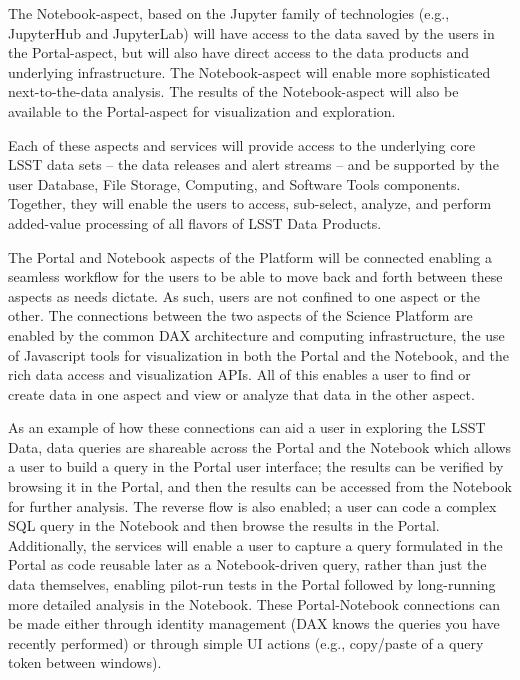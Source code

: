 \documentclass[DM,lsstdraft,toc]{lsstdoc}
\begin{document}
The Notebook-aspect, based on the Jupyter family of technologies (e.g., 
JupyterHub and JupyterLab) will have access to the data saved by the users in 
the Portal-aspect, but will also have direct access to the data products and 
underlying infrastructure.  The Notebook-aspect will enable more sophisticated 
next-to-the-data analysis.  The results of the Notebook-aspect will also be 
available to the Portal-aspect for visualization and exploration.  

Each of these aspects and services will provide access to the underlying core 
LSST data sets -- the data releases and alert streams -- and be supported by 
the user Database, File Storage, Computing, and Software Tools components.  
Together, they will enable the users to access, sub-select, analyze, and perform 
added-value processing of all flavors of LSST Data Products.

The Portal and Notebook aspects of the Platform will be connected enabling a 
seamless workflow for the users to be able to move back and forth between these 
aspects as needs dictate.  As such, users are not confined to one aspect or the 
other.  The connections between the two aspects of the Science Platform are 
enabled by the common DAX architecture and computing infrastructure, the use of 
Javascript tools for visualization in both the Portal and the Notebook, and the 
rich data access and visualization APIs.  All of this enables a user to find or 
create data in one aspect and view or analyze that data in the other aspect.

As an example of how these connections can aid a user in exploring the LSST 
Data, data queries are shareable across the Portal and the Notebook which allows 
a user to build a query in the Portal user interface; the results can be 
verified by browsing it in the Portal, and then the results can be accessed from 
the Notebook for further analysis.  The reverse flow is also enabled; a user can 
code a complex SQL query in the Notebook and then browse the results in the 
Portal.  Additionally, the services will enable a user to capture a query 
formulated in the Portal as code reusable later as a Notebook-driven query, 
rather than just the data themselves, enabling pilot-run tests in the Portal 
followed by long-running more detailed analysis in the Notebook.  These 
Portal-Notebook connections can be made either through identity management (DAX 
knows the queries you have recently performed) or through simple UI actions 
(e.g., copy/paste of a query token between windows).
\end{document}
